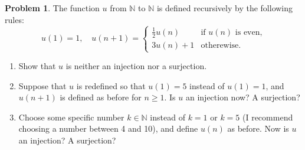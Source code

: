 \documentclass{article}
\numberwithin{equation}{section}
\theoremstyle{plain}
\theoremstyle{definition}
\newtheorem{problem}{Problem}
\newcommand{\N}{\mathbb N}
\begin{document}
\begin{problem}
	The function $u$ from $\N$ to $\N$ is defined recursively by the following rules: \[
	u(1) = 1, \quad u(n+1)= \begin{cases}
	\frac 1 2 u(n) & \textrm{if $u(n)$ is even,} \\
	3u(n)+1 & \textrm{otherewise.}
	\end{cases}
	\]
	\begin{enumerate}[label=(\alph*)]
		\item Show that $u$ is neither an injection nor a surjection. 
		\item Suppose that $u$ is redefined so that $u(1) = 5$ instead of $u(1) = 1$, and $u(n+1)$ is defined as before for $n \geq 1$. Is $u$ an injection now? A surjection? 
		\item Choose some specific number $k \in \N$ instead of $k=1$ or $k=5$ (I recommend choosing a number between 4 and 10), and define $u(n)$ as before. Now is $u$ an injection? A surjection?
	\end{enumerate} 
\end{problem}
\end{document}
